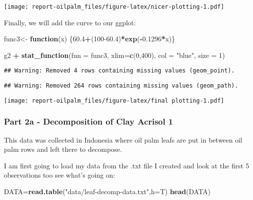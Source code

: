 \documentclass[
]{article}
\newenvironment{Shaded}{\begin{snugshade}}{\end{snugshade}}
\newcommand{\ControlFlowTok}[1]{\textcolor[rgb]{0.13,0.29,0.53}{\textbf{#1}}}
\newcommand{\DataTypeTok}[1]{\textcolor[rgb]{0.13,0.29,0.53}{#1}}
\newcommand{\DecValTok}[1]{\textcolor[rgb]{0.00,0.00,0.81}{#1}}
\newcommand{\FloatTok}[1]{\textcolor[rgb]{0.00,0.00,0.81}{#1}}
\newcommand{\KeywordTok}[1]{\textcolor[rgb]{0.13,0.29,0.53}{\textbf{#1}}}
\newcommand{\NormalTok}[1]{#1}
\newcommand{\OperatorTok}[1]{\textcolor[rgb]{0.81,0.36,0.00}{\textbf{#1}}}
\newcommand{\StringTok}[1]{\textcolor[rgb]{0.31,0.60,0.02}{#1}}
\begin{document}
\texttt{[image: report-oilpalm\_files/figure-latex/nicer-plotting-1.pdf]}

Finally, we will add the curve to our ggplot:

\begin{Shaded}
\begin{Highlighting}[]
\NormalTok{func3<-}\StringTok{ }\ControlFlowTok{function}\NormalTok{(x) \{}\FloatTok{60.4}\OperatorTok{+}\NormalTok{(}\DecValTok{100}\FloatTok{-60.4}\NormalTok{)}\OperatorTok{*}\KeywordTok{exp}\NormalTok{(}\OperatorTok{-}\FloatTok{0.1296}\OperatorTok{*}\NormalTok{x)\}}

\NormalTok{g2 }\OperatorTok{+}
\StringTok{  }\KeywordTok{stat_function}\NormalTok{(}\DataTypeTok{fun =}\NormalTok{ func3, }\DataTypeTok{xlim=}\KeywordTok{c}\NormalTok{(}\DecValTok{0}\NormalTok{,}\DecValTok{400}\NormalTok{), }\DataTypeTok{col =} \StringTok{"blue"}\NormalTok{, }\DataTypeTok{size =} \DecValTok{1}\NormalTok{) }
\end{Highlighting}
\end{Shaded}

\begin{verbatim}
## Warning: Removed 4 rows containing missing values (geom_point).
\end{verbatim}

\begin{verbatim}
## Warning: Removed 264 rows containing missing values (geom_path).
\end{verbatim}

\texttt{[image: report-oilpalm\_files/figure-latex/final plotting-1.pdf]}

\hypertarget{part-2a---decomposition-of-clay-acrisol-1}{%
\subsubsection{Part 2a - Decomposition of Clay Acrisol
1}\label{part-2a---decomposition-of-clay-acrisol-1}}

This data was collected in Indonesia where oil palm leafs are put in
between oil palm rows and left there to decompose.

I am first going to load my data from the .txt file I created and look
at the first 5 observations too see what's going on:

\begin{Shaded}
\begin{Highlighting}[]
\NormalTok{DATA=}\KeywordTok{read.table}\NormalTok{(}\StringTok{"data/leaf-decomp-data.txt"}\NormalTok{,}\DataTypeTok{h=}\NormalTok{T)}
\KeywordTok{head}\NormalTok{(DATA)}
\end{Highlighting}
\end{Shaded}
\end{document}
